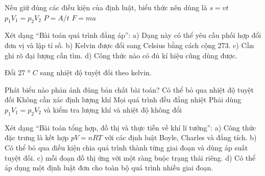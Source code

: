 \begin{ex}
Nếu giữ đúng các điều kiện của định luật, biểu thức nên dùng là
\choice
{$s=vt$}
{\True $p_1V_1=p_2V_2$}
{$P=A/t$}
{$F=ma$}
\end{ex}

\begin{ex}
Xét dạng “Bài toán quá trình đẳng áp”: a) Dạng này có thể yêu cầu phối hợp đổi đơn vị và lập tỉ số. b) Kelvin được đổi sang Celsius bằng cách cộng 273. c) Cần ghi rõ đại lượng cần tìm. d) Công thức nào có đủ kí hiệu cũng dùng được.
\choiceTF

\end{ex}

\begin{ex}
Đổi 27 ° $C$ sang nhiệt độ tuyệt đối theo kelvin.
\end{ex}

\begin{ex}
Phát biểu nào phản ánh đúng bản chất bài toán?
\choice
{Có thể bỏ qua nhiệt độ tuyệt đối}
{Không cần xác định lượng khí}
{Mọi quá trình đều đẳng nhiệt}
{\True Phải dùng $p_1V_1=p_2V_2$ và kiểm tra lượng khí và nhiệt độ không đổi}
\end{ex}

\begin{ex}
Xét dạng “Bài toán tổng hợp, đồ thị và thực tiễn về khí lí tưởng”: a) Công thức đặc trưng là kết hợp $pV=nRT$ với các định luật Boyle, Charles và đẳng tích. b) Có thể bỏ qua điều kiện chia quá trình thành từng giai đoạn và dùng áp suất tuyệt đối. c) mỗi đoạn đồ thị ứng với một ràng buộc trạng thái riêng. d) Có thể áp dụng một định luật đơn cho toàn bộ quá trình nhiều giai đoạn.
\choiceTF

\end{ex}

